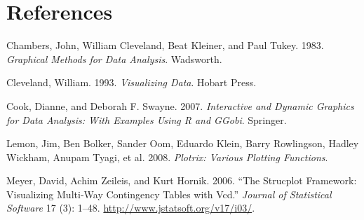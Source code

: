 \begin{Shaded}
\begin{Highlighting}[]
\end{Highlighting}
\end{Shaded}

\section*{References}

Chambers, John, William Cleveland, Beat Kleiner, and Paul Tukey. 1983.
\emph{Graphical Methods for Data Analysis}. Wadsworth.

Cleveland, William. 1993. \emph{Visualizing Data}. Hobart Press.

Cook, Dianne, and Deborah F. Swayne. 2007. \emph{Interactive and Dynamic
Graphics for Data Analysis: With Examples Using R and GGobi}. Springer.

Lemon, Jim, Ben Bolker, Sander Oom, Eduardo Klein, Barry Rowlingson,
Hadley Wickham, Anupam Tyagi, et al. 2008. \emph{Plotrix: Various
Plotting Functions}.

Meyer, David, Achim Zeileis, and Kurt Hornik. 2006. ``The Strucplot
Framework: Visualizing Multi-Way Contingency Tables with Vcd.''
\emph{Journal of Statistical Software} 17 (3): 1--48.
\url{http://www.jstatsoft.org/v17/i03/}.

